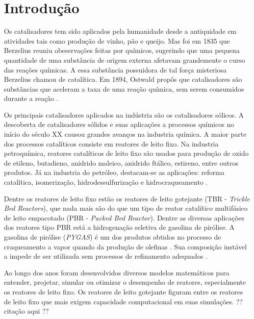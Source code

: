 %
% 
%
\chapter{Introdução} \label{chap:introducao}

Os catalisadores tem sido aplicados pela humanidade desde a antiquidade
em atividades tais como produção de vinho, pão e queijo. Mas foi em 1835 que
Berzelius reuniu obeservações feitas por químicos, sugerindo que uma pequena
quantidade de uma substância de origem externa afetavam grandemente o curso das
reações químicas. A essa substância possuidora de tal força misteriosa Berzelius
chamou de catalítica. Em 1894, Ostwald propôs que catalisadores são substâncias
que aceleram a taxa de uma reação química, sem serem consumidos durante a reação
\cite{Oyama1988}.

Os principais catalisadores aplicados na indústria são os catalisadores
sólicos. A descoberta de catalisadores sólidos e suas aplicações a processos
químicos no início do século XX causou grandes avanços na industria química. A
maior parte dos processos catalíticos consiste em reatores de leito fixo. Na
industria petroquímica, reatores catalíticos de leito fixo são usados para
produção de oxido de etileno, butadieno, anidrido maleico, anidrido ftálico,
estireno, entre outros produtos. Já na industria do petróleo, destacam-se as
aplicações: reforma catalítica, isomerização, hidrodessulfurização e
hidrocraqueamento \cite{Froment2011}.

Dentre os reatores de leito fixo estão os reatores de leito gotejante
(TBR - \emph{Trickle Bed Reactors}), que nada mais são do que um tipo de reator
catalítico multifásico de leito empacotado (PBR - \emph{Packed Bed Reactor}).
Dentre as diversas aplicações dos reatores tipo PBR está a hidrogenação
seletiva de gasolina de pirólise. A gasolina de pirólise (\emph{PYGAS}) é um dos
produtos obtidos no processo de craqueamento a vapor quando da produção de
olefinas \cite{Cheng1986}. Sua composição instável a impede de ser utilizada sem
processos de refinamento adequados \cite{Derrien1986}.

Ao longo dos anos foram desenvolvidos diversos modelos matemáticos para
entender, projetar, simular ou otimizar o desempenho de reatores, especialmente
os reatores de leito fixo. Os reatores de leito gotejante figuram entre os
reatores de leito fixo que mais exigem capacidade computacional em suas
simulações. ?? citação aqui ??

